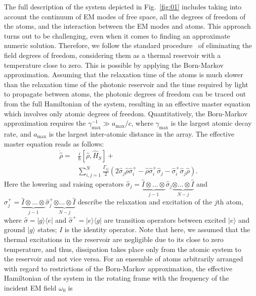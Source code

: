 \documentclass[aps,prl,twocolumn,superscriptaddress,showpacs,amsmath,amssymb]{revtex4-2}
\begin{document}
The full description of the system depicted in Fig.~\ref{fig:01} includes taking into account the continuum of EM modes of free space, all the degrees of freedom of the atoms, and the interaction between the EM modes and atoms. 
This approach turns out to be challenging, even when it comes to finding an approximate numeric solution. Therefore, we follow the standard procedure~\cite{carmichael1999statistical,bettles_quantum_2020,wild_algorithms_nodate} of eliminating the field degrees of freedom, considering them as a thermal reservoir with a temperature close to zero.
This is possible by applying the Born-Markov approximation. 
Assuming that the relaxation time of the atoms is much slower than the relaxation time of the photonic reservoir and the time required by light to propagate between atoms, the photonic degrees of freedom can be traced out from the full Hamiltonian of the system, resulting in an effective master equation which involves only atomic degrees of freedom.
Quantitatively, the Born-Markov approximation requires the $\gamma_{\mathrm{max}}^{-1} \gg a_\mathrm{max} / c$, where $\gamma_\mathrm{max}$ is the largest atomic decay rate, and $a_\mathrm{max}$ is the largest inter-atomic distance in the array.
The effective master equation reads as follows:
\begin{align} \label{eq:01}
    \dot{\hat{\rho}} =& \frac{i}{\hbar}\left[ \hat{\rho}, \hat{H}_S \right] + \nonumber \\
                      & \sum_{i,j=1}^N \frac{\Gamma_{ij}}{2}\left( 2 \hat{\sigma}_j \hat{\rho} \hat{\sigma}^+_i - \hat{\rho} \hat{\sigma}^+_i \hat{\sigma}_j - \hat{\sigma}^+_i \hat{\sigma}_j \hat{\rho}\right).
\end{align}
Here the lowering and raising operators $\hat{\sigma}_j = \underbrace{\hat{I} \otimes \ldots \otimes}_{j-1} \hat{\sigma}_j \underbrace{\otimes \ldots \otimes \hat{I}}_{N-j} $ and $\hat{\sigma}_j^+ = \underbrace{\hat{I} \otimes \ldots \otimes}_{j-1} \hat{\sigma}_j^+ \underbrace{\otimes \ldots \otimes
\hat{I}}_{N-j}$ describe the relaxation and excitation of the $j$th atom, where $\hat{\sigma} = |g\rangle \langle e|$ and $\hat{\sigma}^+ = |e\rangle \langle g|$ are transition operators between excited $|e\rangle$ and ground $|g\rangle$ states; $\hat{I}$ is the identity operator.
Note that here, we assumed that the thermal excitations in the reservoir are negligible due to its close to zero temperature, and thus, dissipation takes place only from the atomic system to the reservoir and not vice versa.
For an ensemble of atoms arbitrarily arranged with regard to restrictions of the Born-Markov approximation, the effective Hamiltonian of the system in the rotating frame with the frequency of the incident EM field $\omega_0$ is \cite{bettles_quantum_2020,asenjo-garcia_exponential_2017,shahmoon_cooperative_2017}
\end{document}
